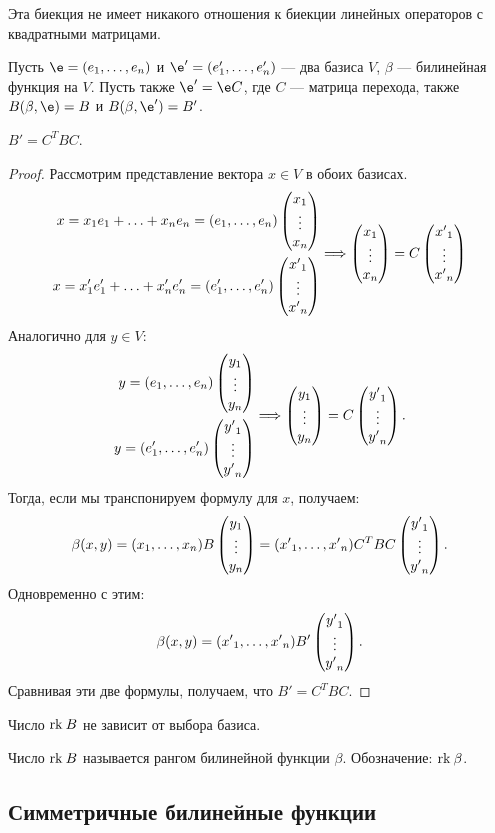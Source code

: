 \begin{Comment}
Эта биекция не имеет никакого отношения к биекции линейных операторов с квадратными матрицами.
\end{Comment}

Пусть $\e = (e_1, \ldots, e_n)$ и $\e' = (e'_1, \ldots, e'_n)$ --- два базиса $V$, $\beta$ --- билинейная функция на $V$. Пусть также $\e' = \e C$, где $C$ --- матрица перехода, также $B(\beta, \e) = B$ и $B(\beta, \e') = B'$.

\begin{Suggestion}
$B' = C^TBC$.
\end{Suggestion}

\begin{proof}
Рассмотрим представление вектора $x \in V$ в обоих базисах.
\begin{gather*}
\begin{aligned}
x = x_1e_1 + \ldots + x_ne_n = (e_1, \ldots, e_n)\begin{pmatrix}{x}_1 \\\vdots\\{x}_n\end{pmatrix} \\
x = x'_1e'_1 + \ldots + x'_ne'_n = (e'_1, \ldots, e'_n) \begin{pmatrix}{x'}_1 \\\vdots\\{x'}_n\end{pmatrix}
\end{aligned}
\Longrightarrow
\begin{pmatrix}{x}_1 \\\vdots\\{x}_n\end{pmatrix} = C\begin{pmatrix}{x'}_1 \\\vdots\\{x'}_n\end{pmatrix}
\end{gather*}
Аналогично для $y \in V$:
\begin{gather*}
\begin{aligned}
y = (e_1, \ldots, e_n)\begin{pmatrix}{y}_1 \\\vdots\\{y}_n\end{pmatrix} \\
y = (e'_1, \ldots, e'_n) \begin{pmatrix}{y'}_1 \\\vdots\\{y'}_n\end{pmatrix}
\end{aligned}
\Longrightarrow
\begin{pmatrix}{y}_1 \\\vdots\\{y}_n\end{pmatrix} = C\begin{pmatrix}{y'}_1 \\\vdots\\{y'}_n\end{pmatrix}.
\end{gather*}
Тогда,  если мы транспонируем формулу для $x$, получаем:
$$
\beta(x, y) = ({x}_1, \ldots, {x}_n)B\begin{pmatrix}{y}_1 \\\vdots\\{y}_n\end{pmatrix} = ({x'}_1, \ldots, {x'}_n)C^TBC\begin{pmatrix}{y'}_1 \\\vdots\\{y'}_n\end{pmatrix}.
$$
Одновременно с этим:
$$
\beta(x, y) = ({x'}_1, \ldots, {x'}_n)B'\begin{pmatrix}{y'}_1 \\\vdots\\{y'}_n\end{pmatrix}.
$$
Сравнивая эти две формулы, получаем, что $B' = C^TBC$.
\end{proof}

\begin{Consequence}
Число $\mathrm{rk}\: B$ не зависит от выбора базиса.
\end{Consequence}

\begin{Def}
Число $\mathrm{rk}\: B$ называется рангом билинейной функции $\beta$. Обозначение: $\mathrm{rk}\: \beta$.
\end{Def}

\subsection*{Симметричные билинейные функции}

